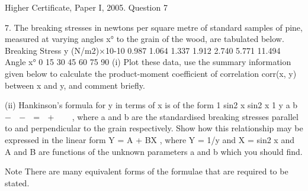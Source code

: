 \documentclass[a4paper,12pt]{article}
\begin{document}
Higher Certificate, Paper I, 2005. Question 7

\begin{framed}
7. The breaking stresses in newtons per square metre of standard samples of pine,
measured at varying angles x° to the grain of the wood, are tabulated below.
Breaking Stress y (N/m2)×10-10 0.987 1.064 1.337 1.912 2.740 5.771 11.494
Angle x° 0 15 30 45 60 75 90
(i) Plot these data, use the summary information given below to calculate the
product-moment coefficient of correlation corr(x, y) between x and y, and
comment briefly.
\end{framed}
\begin{framed}
(ii) Hankinson's formula for y in terms of x is of the form
1 sin2 x sin2 x 1 y
a b
−  −  =  + 
 
,
where a and b are the standardised breaking stresses parallel to and
perpendicular to the grain respectively. Show how this relationship may be
expressed in the linear form
Y = A + BX ,
where Y = 1/y and X = sin2
x and A and B are functions of the unknown
parameters a and b which you should find.
\end{framed}

Note There are many equivalent forms of the formulae that are required to be stated.
\end{document}
